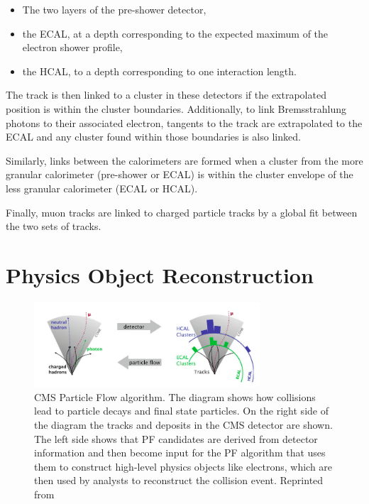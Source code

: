  \begin{itemize}
 	\item The two layers of the pre-shower detector,
 	\item the ECAL, at a depth corresponding to the expected maximum of the electron shower profile,
 	\item the HCAL, to a depth corresponding to one interaction length.
 \end{itemize}

 The track is then linked to a cluster in these detectors if the extrapolated position is within the cluster boundaries. Additionally, to link Bremsstrahlung photons to their associated electron, tangents to the track are extrapolated to the ECAL and any cluster found within those boundaries is also linked.

 Similarly, links between the calorimeters are formed when a cluster from the more granular calorimeter (pre-shower or ECAL) is within the cluster envelope of the less granular calorimeter (ECAL or HCAL).

 Finally, muon tracks are linked to charged particle tracks by a global fit between the two sets of tracks.

 \section{Physics Object Reconstruction}

  \begin{figure}[h]
 	\centering
 	\includegraphics[width=0.75\textwidth]{figures/jets.png}
 	\singlespace
 	\caption{CMS Particle Flow algorithm. The diagram shows how collisions lead to particle decays and final state particles. On the right side of the diagram the tracks and deposits in the CMS detector are shown. The left side shows that PF candidates are derived from detector information and then become input for the PF algorithm that uses them to construct high-level physics objects like electrons, which are then used by analysts to reconstruct the collision event. Reprinted from \cite{CMS-PAS-PFT-09-001}}
  	\label{fig:pf} 	
 \end{figure}

